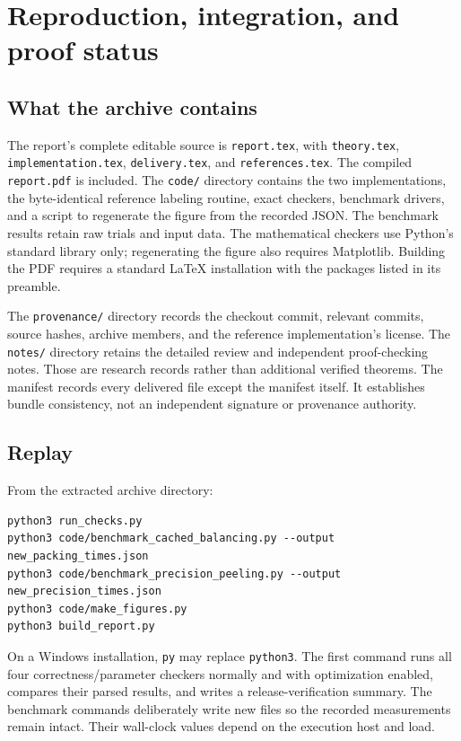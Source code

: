 \section{Reproduction, integration, and proof status}
\label{sec:delivery}

\subsection{What the archive contains}

The report's complete editable source is \texttt{report.tex}, with
\texttt{theory.tex}, \texttt{implementation.tex}, \texttt{delivery.tex},
and \texttt{references.tex}. The compiled \texttt{report.pdf} is included.
The \texttt{code/} directory contains the two implementations, the
byte-identical reference labeling routine, exact checkers, benchmark
drivers, and a script to regenerate the figure from the recorded JSON.
The benchmark results retain raw trials and input data. The mathematical
checkers use Python's standard library only; regenerating the figure
also requires Matplotlib. Building the PDF requires a standard LaTeX
installation with the packages listed in its preamble.

The \texttt{provenance/} directory records the checkout commit, relevant
commits, source hashes, archive members, and the reference implementation's
license. The \texttt{notes/} directory retains the detailed review and
independent proof-checking notes. Those are research records rather than
additional verified theorems. The manifest records every delivered file
except the manifest itself. It establishes bundle consistency, not an
independent signature or provenance authority.

\subsection{Replay}

From the extracted archive directory:
\begin{verbatim}
python3 run_checks.py
python3 code/benchmark_cached_balancing.py --output new_packing_times.json
python3 code/benchmark_precision_peeling.py --output new_precision_times.json
python3 code/make_figures.py
python3 build_report.py
\end{verbatim}
On a Windows installation, \texttt{py} may replace \texttt{python3}.
The first command runs all four correctness/parameter checkers normally
and with optimization enabled, compares their parsed results, and writes
a release-verification summary. The benchmark commands deliberately write
new files so the recorded measurements remain intact. Their wall-clock
values depend on the execution host and load.

